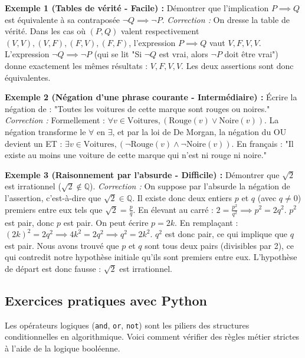 \textbf{Exemple 1 (Tables de vérité - Facile) :} 
Démontrer que l'implication $P \implies Q$ est équivalente à sa contraposée $\neg Q \implies \neg P$.
\textit{Correction :} On dresse la table de vérité.
Dans les cas où $(P,Q)$ valent respectivement $(V,V), (V,F), (F,V), (F,F)$, 
l'expression $P \implies Q$ vaut $V, F, V, V$. 
L'expression $\neg Q \implies \neg P$ (qui se lit "Si $\neg Q$ est vrai, alors $\neg P$ doit être vrai") donne exactement les mêmes résultats : $V, F, V, V$. Les deux assertions sont donc équivalentes.

\textbf{Exemple 2 (Négation d'une phrase courante - Intermédiaire) :}
Écrire la négation de : "Toutes les voitures de cette marque sont rouges ou noires."
\textit{Correction :} Formellement : $\forall v \in \text{Voitures}, (\text{Rouge}(v) \lor \text{Noire}(v))$.
La négation transforme le $\forall$ en $\exists$, et par la loi de De Morgan, la négation du OU devient un ET :
$\exists v \in \text{Voitures}, (\neg\text{Rouge}(v) \land \neg\text{Noire}(v))$.
En français : "Il existe au moins une voiture de cette marque qui n'est ni rouge ni noire."

\textbf{Exemple 3 (Raisonnement par l'absurde - Difficile) :}
Démontrer que $\sqrt{2}$ est irrationnel ($\sqrt{2} \notin \mathbb{Q}$).
\textit{Correction :} On suppose par l'absurde la négation de l'assertion, c'est-à-dire que $\sqrt{2} \in \mathbb{Q}$. 
Il existe donc deux entiers $p$ et $q$ (avec $q \neq 0$) premiers entre eux tels que $\sqrt{2} = \frac{p}{q}$.
En élevant au carré : $2 = \frac{p^2}{q^2} \implies p^2 = 2q^2$.
$p^2$ est pair, donc $p$ est pair. On peut écrire $p = 2k$.
En remplaçant : $(2k)^2 = 2q^2 \implies 4k^2 = 2q^2 \implies q^2 = 2k^2$.
$q^2$ est donc pair, ce qui implique que $q$ est pair.
Nous avons trouvé que $p$ et $q$ sont tous deux pairs (divisibles par 2), ce qui contredit notre hypothèse initiale qu'ils sont premiers entre eux. L'hypothèse de départ est donc fausse : $\sqrt{2}$ est irrationnel.

\subsection{Exercices pratiques avec Python}
Les opérateurs logiques (\texttt{and}, \texttt{or}, \texttt{not}) sont les piliers des structures conditionnelles en algorithmique. Voici comment vérifier des règles métier strictes à l'aide de la logique booléenne.

